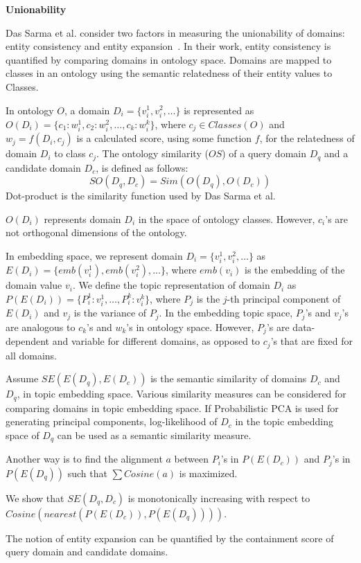 \documentclass[12pt]{article}
\begin{document}
{\bf Unionability}


Das Sarma et al. consider two factors in measuring the unionability of domains: 
entity consistency and entity expansion~\cite{DasSarma:2012}. 
In their work, entity consistency is quantified by comparing domains in ontology space. 
Domains are mapped to classes in an ontology using the semantic relatedness of their 
entity values to Classes.  

In ontology $O$, a domain $D_i =\{v_i^1, v_i^2, \ldots\}$ is represented as 
$O(D_i) =\{c_1:w_i^1, c_2:w_i^2, \ldots, c_k:w_i^k\}$, where $c_j\in Classes(O)$ and 
$w_j=f(D_i, c_j)$ is a calculated score, using some function $f$, for the relatedness of domain $D_i$ to class $c_j$. 
The ontology similarity ($OS$) of a query domain $D_q$ and a candidate domain $D_c$, 
is defined as follows: 
\begin{equation}
	SO(D_q, D_c) = Sim(O(D_q), O(D_c))
\end{equation}
Dot-product is the similarity function used by Das Sarma et al. 

$O(D_i)$ represents domain $D_i$ in the space of ontology classes. 
However, $c_i$'s are not orthogonal dimensions of the ontology. 

In embedding space, we represent domain $D_i =\{v_i^1, v_i^2, \ldots\}$ as 
$E(D_i) = \{emb(v_i^1), emb(v_i^2), \ldots\}$, where $emb(v_i)$ is the embedding of the domain value $v_i$. 
We define the topic representation of domain $D_i$ as 
$P(E(D_i)) = \{P_i^1:v_i^1, \ldots, P_i^k:v_i^k\}$, where 
$P_j$ is the $j$-th principal component of $E(D_i)$ and $v_j$ is the variance of $P_j$. 
In the embedding topic space, $P_j$'s and $v_j$'s are analogous to $c_k$'s and $w_k$'s in ontology space. 
However, $P_j$'s are data-dependent and variable for different domains, 
as opposed to $c_j$'s that are fixed for all domains. 

Assume $SE(E(D_q), E(D_c))$ is the semantic similarity of domains $D_c$ and $D_q$, in topic embedding space. 
Various similarity measures can be considered for comparing domains in topic embedding space. 
If Probabilistic PCA is used for generating principal components, 
log-likelihood of $D_c$ in the topic embedding space of $D_q$ can be used as a semantic similarity measure. 

Another way is to find the alignment $a$ between $P_i$'s in $P(E(D_c))$  
and $P_j$'s in $P(E(D_q))$ such that $\sum Cosine(a)$ is maximized. 

We show that $SE(D_q, D_c)$ is monotonically increasing with respect to 
$Cosine(nearest(P(E(D_c)), P(E(D_q))))$. 
 
The notion of entity expansion can be quantified by the containment score of 
query domain and candidate domains. 



\end{document}
